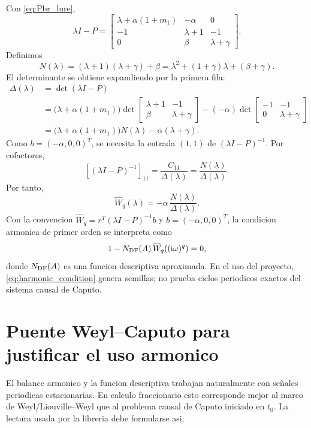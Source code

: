 \documentclass[11pt]{article}
\newcommand{\ii}{\mathrm{i}}
\begin{document}
Con \eqref{eq:Pbr_lure},
\[
\lambda I-P=
\begin{bmatrix}
\lambda+\alpha(1+m_1)&-\alpha&0\\
-1&\lambda+1&-1\\
0&\beta&\lambda+\gamma
\end{bmatrix}.
\]
Definimos
\begin{equation}
\label{eq:Nlambda}
N(\lambda)=(\lambda+1)(\lambda+\gamma)+\beta
=\lambda^2+(1+\gamma)\lambda+(\beta+\gamma).
\end{equation}
El determinante se obtiene expandiendo por la primera fila:
\begin{align}
\Delta(\lambda)
&=\det(\lambda I-P)\\
&=
\bigl(\lambda+\alpha(1+m_1)\bigr)
\det
\begin{bmatrix}
\lambda+1&-1\\
\beta&\lambda+\gamma
\end{bmatrix}
-(-\alpha)
\det
\begin{bmatrix}
-1&-1\\
0&\lambda+\gamma
\end{bmatrix}\\
&=
\bigl(\lambda+\alpha(1+m_1)\bigr)N(\lambda)
-\alpha(\lambda+\gamma).
\end{align}
Como \(b=(-\alpha,0,0)^T\), se necesita la entrada \((1,1)\) de
\((\lambda I-P)^{-1}\). Por cofactores,
\[
[(\lambda I-P)^{-1}]_{11}
=
\frac{C_{11}}{\Delta(\lambda)}
=
\frac{N(\lambda)}{\Delta(\lambda)}.
\]
Por tanto,
\begin{equation}
\label{eq:W_hat_explicit}
\widehat W_q(\lambda)
=
-\alpha\,
\frac{N(\lambda)}{\Delta(\lambda)}.
\end{equation}
Con la convencion \(\widehat W_q=r^T(\lambda I-P)^{-1}b\) y
\(b=(-\alpha,0,0)^T\), la condicion armonica de primer orden se interpreta como
\begin{equation}
\label{eq:harmonic_condition}
1-N_{\rm DF}(A)\,
\widehat W_q\!\left((\ii\omega)^q\right)=0,
\end{equation}
donde \(N_{\rm DF}(A)\) es una funcion descriptiva aproximada. En el uso del
proyecto, \eqref{eq:harmonic_condition} genera semillas; no prueba ciclos
periodicos exactos del sistema causal de Caputo.

\section{Puente Weyl--Caputo para justificar el uso armonico}

El balance armonico y la funcion descriptiva trabajan naturalmente con señales
periodicas estacionarias. En calculo fraccionario esto corresponde mejor al
marco de Weyl/Liouville--Weyl que al problema causal de Caputo iniciado en
\(t_0\). La lectura usada por la libreria debe formularse asi:
\end{document}
